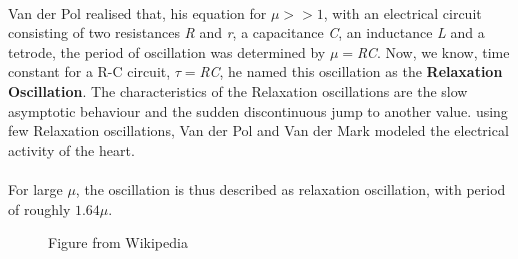 \documentclass{article}
\begin{document}
\\
Van der Pol realised that, his equation for $\mu>>1$, with an electrical circuit consisting of two resistances \textit{R} and \textit{r}, a capacitance \textit{C}, an inductance \textit{L} and a tetrode, the period of oscillation was determined by $\mu=$\textit{RC}. Now, we know, time constant for a R-C circuit, $\tau=$\textit{RC}, he named this oscillation as the \textbf{Relaxation Oscillation}. The characteristics of the Relaxation oscillations are the slow asymptotic behaviour and the sudden discontinuous jump to another value. using few Relaxation oscillations, Van der Pol and Van der Mark modeled the electrical activity of the heart.\\
\\
For large $\mu$, the oscillation is thus described as relaxation oscillation, with period of roughly $1.64\mu$.
\begin{figure}[H]
\centering 
\noindent{}%
\caption{Figure from Wikipedia}
\end{figure}
\end{document}

